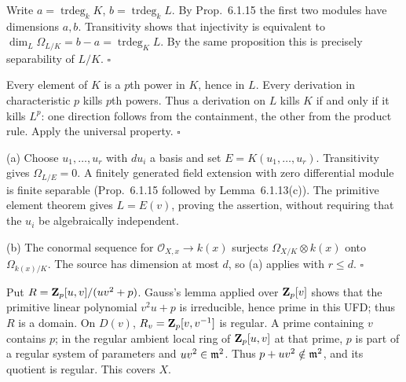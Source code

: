 \documentclass[11pt]{article}
\let\chapterexercise\exercise
\renewcommand{\exercise}[2]{\Needspace{8\baselineskip}\chapterexercise{#1}{#2}}
\begin{document}
\pf
Write $a=\operatorname{trdeg}_kK$, $b=\operatorname{trdeg}_kL$. By Prop.~6.1.15 the first two modules have dimensions $a,b$. Transitivity shows that injectivity is equivalent to $\dim_L\Omega_{L/K}=b-a=\operatorname{trdeg}_KL$. By the same proposition this is precisely separability of $L/K$. \hfill$\square$

\pf
Every element of $K$ is a $p$th power in $K$, hence in $L$. Every derivation in characteristic $p$ kills $p$th powers. Thus a derivation on $L$ kills $K$ if and only if it kills $L^p$: one direction follows from the containment, the other from the product rule. Apply the universal property. \hfill$\square$

\pf
(a) Choose $u_1,\ldots,u_r$ with $du_i$ a basis and set $E=K(u_1,\ldots,u_r)$. Transitivity gives $\Omega_{L/E}=0$. A finitely generated field extension with zero differential module is finite separable (Prop.~6.1.15 followed by Lemma~6.1.13(c)). The primitive element theorem gives $L=E(v)$, proving the assertion, without requiring that the $u_i$ be algebraically independent.

(b) The conormal sequence for $\mathcal O_{X,x}\to k(x)$ surjects $\Omega_{X/K}\otimes k(x)$ onto $\Omega_{k(x)/K}$. The source has dimension at most $d$, so (a) applies with $r\le d$. \hfill$\square$

\pf
Put $R=\mathbf Z_p[u,v]/(uv^2+p)$. Gauss's lemma applied over $\mathbf Z_p[v]$ shows that the primitive linear polynomial $v^2u+p$ is irreducible, hence prime in this UFD; thus $R$ is a domain. On $D(v)$, $R_v=\mathbf Z_p[v,v^{-1}]$ is regular. A prime containing $v$ contains $p$; in the regular ambient local ring of $\mathbf Z_p[u,v]$ at that prime, $p$ is part of a regular system of parameters and $uv^2\in\mathfrak m^2$. Thus $p+uv^2\notin\mathfrak m^2$, and its quotient is regular. This covers $X$.
\end{document}
